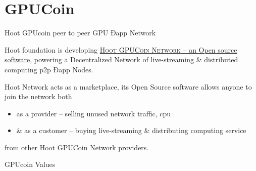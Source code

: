 \documentclass[10pt,handout]{beamer}
\begin{document}
\section{GPUCoin}
\begin{frame}[fragile]{Hoot GPUcoin peer to peer GPU Ðapp Network }

 Hoot foundation is developing \href{https://onhoot.com/tokensale}{\textsc{Hoot GPUCoin Network} – an Open source software}, powering a Decentralized Network of live-streaming \& distributed computing p2p Ðapp Nodes.
 

Hoot Network acts as a marketplace, its Open Source software allows anyone to join the network both 

\begin{itemize}
\item as a provider – selling unused network traffic, cpu
\item \& as a customer – buying live-streaming \& distributing computing service
\end{itemize}
 from other Hoot GPUCoin Network providers. 
\end{frame}

\begin{frame}[t]{GPUcoin Values}


\end{frame}
\end{document}
